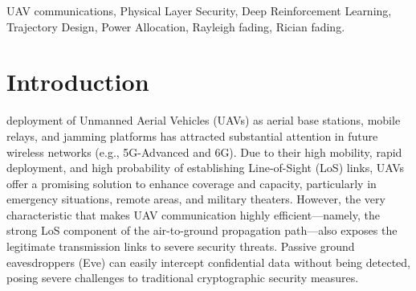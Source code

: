 \documentclass[journal,onecolumn]{IEEEtran}
\begin{document}
\begin{abstract}
\end{abstract}

\begin{IEEEkeywords}
UAV communications, Physical Layer Security, Deep Reinforcement Learning, Trajectory Design, Power Allocation, Rayleigh fading, Rician fading.
\end{IEEEkeywords}

\IEEEpeerreviewmaketitle

\section{Introduction}
 deployment of Unmanned Aerial Vehicles (UAVs) as aerial base stations, mobile relays, and jamming platforms has attracted substantial attention in future wireless networks (e.g., 5G-Advanced and 6G). Due to their high mobility, rapid deployment, and high probability of establishing Line-of-Sight (LoS) links, UAVs offer a promising solution to enhance coverage and capacity, particularly in emergency situations, remote areas, and military theaters. However, the very characteristic that makes UAV communication highly efficient—namely, the strong LoS component of the air-to-ground propagation path—also exposes the legitimate transmission links to severe security threats. Passive ground eavesdroppers (Eve) can easily intercept confidential data without being detected, posing severe challenges to traditional cryptographic security measures.
\end{document}
